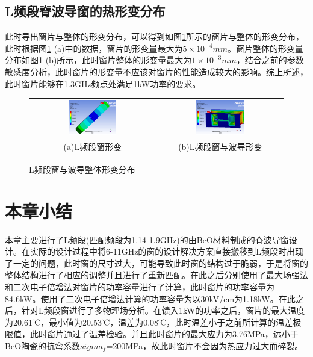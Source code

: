 \documentclass[master]{thesis-uestc}
\begin{document}
\subsection{L频段脊波导窗的热形变分布}

此时导出窗片与整体的形变分布，可以得到如图\ref{fig:L频段窗与整体形变分布}所示的窗片与整体的形变分布，此时根据图\ref{fig:L频段窗与整体形变分布} (a)中的数据，窗片的形变量最大为\(5 \times 10 ^{-4}mm\)。窗片整体的形变量分布如图\ref{fig:L频段窗与整体形变分布} (b)所示，此时窗片整体的形变量最大为\(1 \times 10 ^{-3}mm\)，结合之前的参数敏感度分析，此时窗片的形变量不应该对窗片的性能造成较大的影响。综上所述，此时窗片能够在1.3GHz频点处满足1kW功率的要求。
\begin{figure}[!htb]
    \small
    \centering
    \begin{tabular}{@{\ }c@{\ }c}
        \includegraphics[width=0.4\textwidth]{pic/chapter4/L频段窗形变.png} & 
        \hspace{5pt}
        \includegraphics[width=0.4\textwidth]{pic/chapter4/L频段整体形变.png}     \\
        \mbox{\small (a)L频段窗形变}                                                                               & 
        \mbox{\small (b)L频段窗与波导形变}                                                                                  \\
    \end{tabular}
    \caption{L频段窗与波导整体形变分布}
    \label{fig:L频段窗与整体形变分布}
\end{figure}

\section{本章小结}
本章主要进行了L频段(匹配频段为1.14-1.9GHz)的由BeO材料制成的脊波导窗设计。在实际的设计过程中将6-11GHz的窗的设计解决方案直接搬移到L频段时出现了一定的问题，此时窗的尺寸过大，可能导致此时窗的结构过于脆弱，于是将窗的整体结构进行了相应的调整并且进行了重新匹配。在此之后分别使用了最大场强法和二次电子倍增法对窗片的功率容量进行了计算，此时窗片的功率容量为84.6kW。使用了二次电子倍增法计算的功率容量为以30kV/cm为1.18kW。在此之后，针对L频段窗进行了多物理场分析。在馈入1kW的功率之后，窗片的最大温度为20.61℃，最小值为20.53℃，温差为0.08℃，此时温差小于之前所计算的温差极限值，此时窗片通过了温差检验。并且此时窗片的最大应力为3.76MPa，远小于BeO陶瓷的抗弯系数\(sigma_f\)=200MPa，故此时窗片不会因为热应力过大而碎裂。
\end{document}
